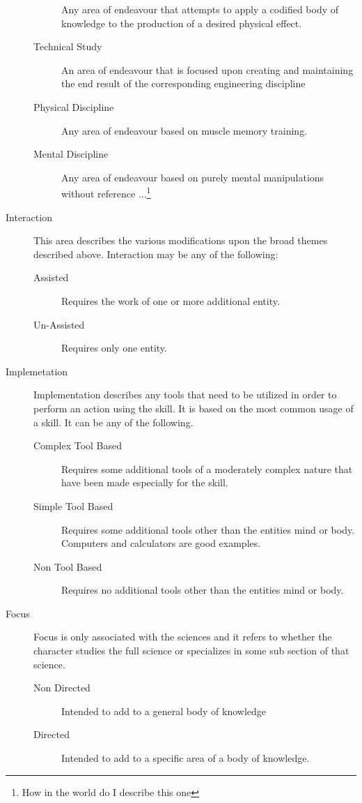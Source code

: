 \begin{description}
\begin{description}
		Any area of endeavour that attempts to apply a codified body of
		knowledge to the production of a desired physical effect.
		\item[Technical Study]
		An area of endeavour that is focused upon creating and maintaining the
		end result of the corresponding engineering discipline
		\item[Physical Discipline]
		Any area of endeavour based on muscle memory training.
		\item[Mental Discipline]
		Any area of endeavour based on purely mental manipulations without 
		reference ...\footnote{How in the world do I describe this one}
		\end{description}
		\item[Interaction]
		This area describes the various modifications upon the broad themes
		described above. Interaction may be any of the following:
		\begin{description}
			\item[Assisted]
			Requires the work of one or more additional entity.
			\item[Un-Assisted]
			Requires only one entity.
		\end{description}
	\item[Implemetation]
	Implementation describes any tools that need to be utilized in order 
	to perform an action using the skill. It is based on the most common
	usage of a skill. It can be any of the following.
	\begin{description}
		\item[Complex Tool Based]
		Requires some additional tools of a moderately complex nature that have been
		made especially for the skill.
		\item[Simple Tool Based]
		Requires some additional tools other than the entities mind or body. 
		Computers and calculators are good examples.
		\item[Non Tool Based]
		Requires no additional tools other than the entities mind or body.
	\end{description}
	\item[Focus]
	Focus is only associated with the sciences and it refers to whether 
	the character studies the full science or specializes in some sub 
	section of that science.
	\begin{description}
		\item[Non Directed]
		Intended to add to a general body of knowledge
		\item[Directed]
		Intended to add to a specific area of a body of knowledge.
	\end{description}
\end{description}

